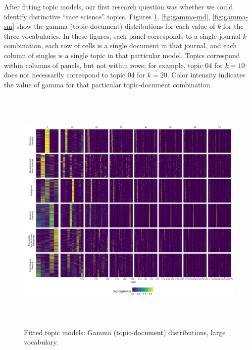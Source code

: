 \documentclass[12pt]{article}
\begin{document}
After fitting topic models, our first research question was whether we could identify distinctive ``race science'' topics. Figures \ref{fig:gamma-lg}, \ref{fig:gamma-md}, \ref{fig:gamma-sm} show the gamma (topic-document) distributions for each value of \(k\) for the three vocabularies. In these figures, each panel corresponds to a single journal-\(k\) combination, each row of cells is a single document in that journal, and each column of singles is a single topic in that particular model. Topics correspond within columns of panels, but not within rows; for example, topic 04 for \(k=10\) does not necessarily correspond to topic 04 for \(k=20\). Color intensity indicates the value of gamma for that particular topic-document combination.

\begin{figure}
\centering
\includegraphics[width=6in,height=4.8in]{img/05_lg_gamma.png}
\caption{Fitted topic models: Gamma (topic-document) distributions, large vocabulary. \label{fig:gamma-lg}}
\end{figure}
\end{document}
